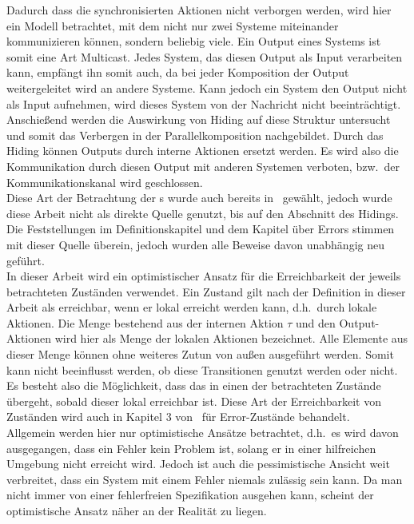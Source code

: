 Dadurch dass die synchronisierten Aktionen nicht verborgen werden, wird hier
ein Modell betrachtet, mit dem nicht nur zwei Systeme miteinander kommunizieren können,
sondern beliebig viele. Ein Output eines Systems ist somit eine Art Multicast.
Jedes System, das diesen Output als Input verarbeiten kann, empfängt ihn somit auch,
da bei jeder Komposition der Output weitergeleitet wird an andere Systeme.
Kann jedoch ein System den Output nicht als Input aufnehmen, wird dieses System von
der Nachricht nicht beeinträchtigt.\\
Anschießend werden die Auswirkung von Hiding auf diese Struktur
untersucht und somit das Verbergen in der Parallelkomposition nachgebildet.
Durch das Hiding können Outputs durch interne Aktionen ersetzt werden. Es wird
also die Kommunikation durch diesen Output mit anderen Systemen verboten, bzw.\
der Kommunikationskanal wird geschlossen.\\
Diese Art der Betrachtung der
\EIO{}s wurde auch bereits in~\cite{Schlosser2012BA} gewählt, jedoch wurde
diese Arbeit nicht als direkte Quelle genutzt, bis auf den Abschnitt des
Hidings. Die Feststellungen im Definitionskapitel und dem Kapitel über
Errors stimmen mit dieser Quelle überein, jedoch wurden alle Beweise davon unabhängig neu
geführt.\\
In dieser Arbeit wird ein optimistischer Ansatz für die Erreichbarkeit
der jeweils betrachteten Zuständen verwendet. Ein Zustand gilt nach der Definition in dieser
Arbeit als erreichbar, wenn er lokal erreicht
werden kann, d.h.\ durch lokale Aktionen. Die Menge bestehend aus der internen
Aktion $\tau$ und den Output-Aktionen wird hier als Menge der lokalen Aktionen
bezeichnet.
Alle Elemente aus dieser Menge können ohne weiteres Zutun von außen ausgeführt
werden. Somit kann nicht beeinflusst werden, ob diese Transitionen genutzt
werden oder nicht. Es besteht also die Möglichkeit, dass das \EIO{} in einen
der betrachteten Zustände übergeht, sobald dieser lokal erreichbar ist. Diese Art der
Erreichbarkeit von Zuständen wird auch in Kapitel 3 von~\cite{Vogler2014EIO}
für Error-Zustände behandelt.\\
Allgemein werden hier nur optimistische Ansätze betrachtet, d.h.\ es wird davon
ausgegangen, dass ein Fehler kein Problem ist, solang er in einer hilfreichen
Umgebung nicht erreicht wird. Jedoch ist auch die pessimistische Ansicht weit
verbreitet, dass ein System mit einem Fehler niemals zulässig sein kann. Da man
nicht immer von einer fehlerfreien Spezifikation ausgehen kann, scheint der
optimistische Ansatz näher an der Realität zu liegen.\\
